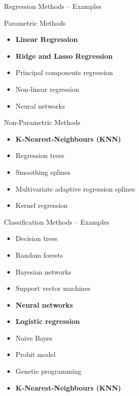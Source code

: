 \documentclass[ignorenonframetext,xcolor=x11names]{beamer}
\begin{document}
\begin{frame}{Regression Methods -- Examples}
\begin{block}{Parametric Methods}
\begin{itemize}
   \item \textbf{Linear Regression}
   \item \textbf{Ridge and Lasso Regression}
   \item Principal components regression
   \item Non-linear regression
   \item Neural networks
\end{itemize}
\end{block}

\begin{block}{Non-Parametric Methods}
\begin{itemize}
  \item \textbf{K-Nearest-Neighbours (KNN)}
  \item Regression trees
  \item Smoothing splines
  \item Multivariate adaptive regression splines
  \item Kernel regression
\end{itemize}
\end{block}
\end{frame}

\begin{frame}{Classification Methods -- Examples}
\begin{itemize}
   \item Decision trees
   \item Random forests
   \item Bayesian networks
   \item Support vector machines
   \item \textbf{Neural networks}
   \item \textbf{Logistic regression}
   \item Naive Bayes
   \item Probit model
   \item Genetic programming
   \item \textbf{K-Nearest-Neighbours (KNN)}
\end{itemize}
\end{frame}
\end{document}
